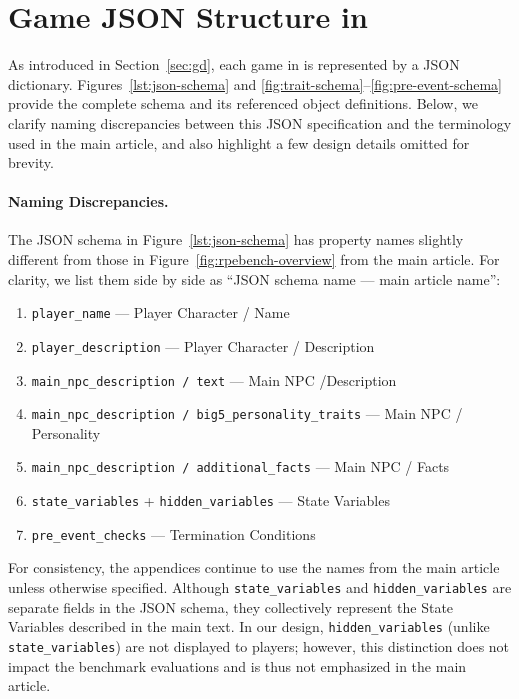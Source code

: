 \section{Game JSON Structure in \benchmark{}}\label{app:game_json}

As introduced in Section~\ref{sec:gd}, each game in \benchmark{} is represented by a JSON dictionary. Figures~\ref{lst:json-schema} and \ref{fig:trait-schema}--\ref{fig:pre-event-schema} provide the complete schema and its referenced object definitions. Below, we clarify naming discrepancies between this JSON specification and the terminology used in the main article, and also highlight a few design details omitted for brevity.

\paragraph{Naming Discrepancies.}
The JSON schema in Figure~\ref{lst:json-schema} has property names slightly different from those in Figure~\ref{fig:rpebench-overview} from the main article. For clarity, we list them side by side as ``JSON schema name --- main article name'':

\begin{enumerate}
    \item \texttt{player\_name} --- Player Character / Name
    \item \texttt{player\_description} --- Player Character / Description
    \item \texttt{main\_npc\_description / text} --- Main NPC /Description
    \item \texttt{main\_npc\_description / big5\_personality\_traits} --- Main NPC / Personality
    \item \texttt{main\_npc\_description / additional\_facts} --- Main NPC / Facts
    \item \texttt{state\_variables} + \texttt{hidden\_variables} --- State Variables
    \item \texttt{pre\_event\_checks} --- Termination Conditions
\end{enumerate}

For consistency, the appendices continue to use the names from the main article unless otherwise specified. Although \texttt{state\_variables} and \texttt{hidden\_variables} are separate fields in the JSON schema, they collectively represent the State Variables described in the main text. In our design, \texttt{hidden\_variables} (unlike \texttt{state\_variables}) are not displayed to players; however, this distinction does not impact the benchmark evaluations and is thus not emphasized in the main article.

